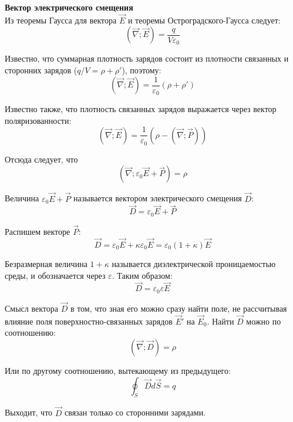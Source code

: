 \documentclass{article}
\begin{document}
	
	\textbf{Вектор электрического смещения}\\

	Из теоремы Гаусса для вектора $\vec E$ и теоремы Остроградского-Гаусса следует:
	\begin{equation}
		(\vec\nabla;\vec E) = \frac{q}{V\varepsilon_0}
	\end{equation}

	Известно, что суммарная плотность зарядов состоит из плотности связанных и сторонних зарядов ($q/V = \rho + \rho'$), поэтому:
	\begin{equation}
		(\vec\nabla;\vec E) = \frac{1}{\varepsilon_0}(\rho+\rho')
	\end{equation}

	Известно также, что плотность связанных зарядов выражается через вектор поляризованности:
	\begin{equation}
		(\vec\nabla;\vec E) = \frac{1}{\varepsilon_0}(\rho-(\vec\nabla;\vec P))
	\end{equation}

	Отсюда следует, что
	\begin{equation}
		(\vec\nabla;\varepsilon_0\vec E + \vec P) = \rho
	\end{equation}

	Величина $\varepsilon_0\vec E + \vec P$ называется вектором электрического смещения $\vec D$:
	\begin{equation}
		\vec D = \varepsilon_0\vec E + \vec P
	\end{equation}

	Распишем векторе $\vec P$:
	\begin{equation}
		\vec D = \varepsilon_0\vec E + \kappa\varepsilon_0\vec E = \varepsilon_0(1+\kappa)\vec E
	\end{equation}

	Безразмерная величина $1+\kappa$ называется диэлектрической проницаемостью среды, и обозначается через $\varepsilon$. Таким образом:
	\begin{equation}
		\vec D = \varepsilon_0\varepsilon\vec E
	\end{equation}

	Смысл вектора $\vec D$ в том, что зная его можно сразу найти поле, не рассчитывая влияние поля поверхностно-связанных зарядов $\vec E'$ на $\vec E_0$. Найти $\vec D$ можно по соотношению:
	\begin{equation}
		(\vec\nabla;\vec D) = \rho
	\end{equation}

	Или по другому соотношению, вытекающему из предыдущего:
	\begin{equation}
		\oint_S \vec D d\vec S = q
	\end{equation}

	Выходит, что $\vec D$ связан только со сторонними зарядами.
\end{document}
